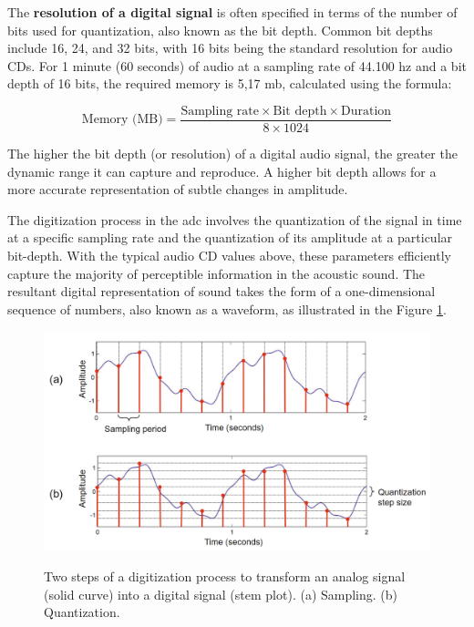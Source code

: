 The \textbf{resolution of a digital signal} is often specified in terms of the number of bits used for quantization, also known as the bit depth. Common bit depths include 16, 24, and 32 bits, with 16 bits being the standard resolution for audio CDs. For 1 minute (60 seconds) of audio at a sampling rate of 44.100 \gls{hz} and a bit depth of 16 bits, the required memory is 5,17 \gls{m}\gls{b}, calculated using the formula: 

\begin{equation}
    \label{eq:frmwk_audio_fund_audio_memory_calculation}
\text{Memory (MB)} = \frac{\text{Sampling rate} \times \text{Bit depth} \times \text{Duration}}{8 \times 1024}
\end{equation}

The higher the bit depth (or resolution) of a digital audio signal, the greater the dynamic range it can capture and reproduce. A higher bit depth allows for a more accurate representation of subtle changes in amplitude.

The digitization process in the \gls{adc} involves the quantization of the signal in time at a specific sampling rate and the quantization of its amplitude at a particular bit-depth. With the typical audio CD values above, these parameters efficiently capture the majority of perceptible information in the acoustic sound. The resultant digital representation of sound takes the form of a one-dimensional sequence of numbers, also known as a waveform, as illustrated in the Figure \ref{fig:frmwk_audio_fund_digitization_process}.

\begin{figure}[htbp]
    \raggedright
        \caption{Two steps of a digitization process to transform an analog signal (solid curve) into a digital signal (stem plot). (a) Sampling. (b) Quantization.}
        \includegraphics[width=1.0\textwidth]{resources/images/030-theoretical_framework/Framework_audio_fund_digitization_process.png}
        \label{fig:frmwk_audio_fund_digitization_process}
\end{figure}

